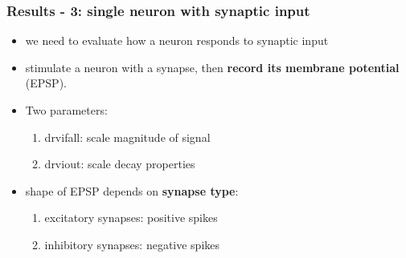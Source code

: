 \documentclass{beamer}
\begin{document}
\begin{frame}
    \frametitle{Results - 3: single neuron with synaptic input}
    \begin{itemize}
    		\item we need to evaluate how a neuron responds to synaptic input
    		\item stimulate a neuron with a synapse,  then \textbf{record its membrane
    		potential} (EPSP).
    		\item Two parameters:
    		\begin{enumerate}
    			\item drvifall: scale magnitude of signal
    			\item drviout: scale decay properties
		\end{enumerate}
		\item shape of EPSP depends on \textbf{synapse type}:
		\begin{enumerate}
			\item excitatory synapses: positive spikes
			\item inhibitory synapses: negative spikes
		\end{enumerate}
    \end{itemize}
\end{frame}
\end{document}
